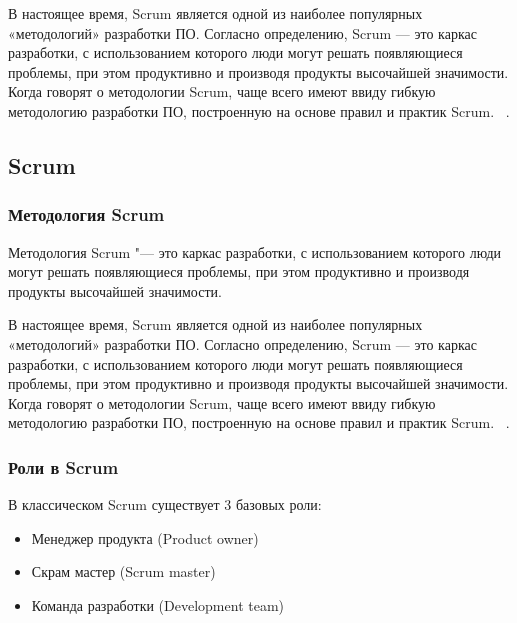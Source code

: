 \documentclass{../industrial-development}
\begin{document}
\lecturenotes
В настоящее время, Scrum является одной из наиболее популярных «методологий» разработки ПО. Согласно определению, Scrum — это каркас разработки, с использованием которого люди могут решать появляющиеся проблемы, при этом продуктивно и производя продукты высочайшей значимости. Когда говорят о методологии Scrum, чаще всего имеют ввиду гибкую методологию разработки ПО, построенную на основе правил и практик Scrum. 
~\cite{Fowler}.


\subsection{Scrum}
\begin{frame} \frametitle{Методология Scrum}
  \begin{block}{}
   \alert{Методология Scrum} "--- это каркас разработки, с использованием которого люди могут решать появляющиеся проблемы, при этом продуктивно и производя продукты высочайшей значимости.
  \end{block}
\end{frame}

\lecturenotes
В настоящее время, Scrum является одной из наиболее популярных «методологий» разработки ПО. Согласно определению, Scrum — это каркас разработки, с использованием которого люди могут решать появляющиеся проблемы, при этом продуктивно и производя продукты высочайшей значимости. Когда говорят о методологии Scrum, чаще всего имеют ввиду гибкую методологию разработки ПО, построенную на основе правил и практик Scrum. 
~\cite{Fowler}.


\begin{frame} \frametitle{Роли в Scrum}
В классическом Scrum существует 3 базовых роли: 
\begin{itemize}
	\item Менеджер продукта (Product owner)
	\item Скрам мастер (Scrum master)
	\item Команда разработки (Development team) 
	\end{itemize}	
\end{frame}
\end{document}
